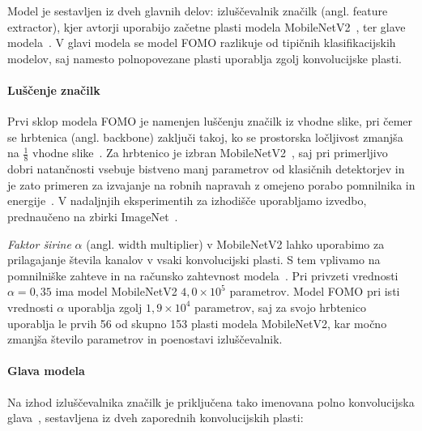 \documentclass[a4paper,twoside,openright,12pt,slovene]{book}
\begin{document}
            Model je sestavljen iz dveh glavnih delov: izluščevalnik značilk (angl. feature extractor), kjer avtorji uporabijo začetne plasti modela MobileNetV2~\cite{src:sandler2018mobilenetv2}, ter glave modela~\cite{src:fomodocs}.
            V glavi modela se model FOMO razlikuje od tipičnih klasifikacijskih modelov, saj namesto polnopovezane plasti uporablja zgolj konvolucijske plasti.
    
            \paragraph{Luščenje značilk} \label{sct:fomo-ekstraktor-znacilk}
            Prvi sklop modela FOMO je namenjen luščenju značilk iz vhodne slike, pri čemer se hrbtenica (angl. backbone) zaključi takoj, ko se prostorska ločljivost zmanjša na $\tfrac18$ vhodne slike~\cite{src:fomodocs}.  
            Za hrbtenico je izbran MobileNetV2~\cite{src:sandler2018mobilenetv2}, saj pri primerljivo dobri natančnosti vsebuje bistveno manj parametrov od klasičnih detektorjev in je zato primeren za izvajanje na robnih napravah z omejeno porabo pomnilnika in energije~\cite{src:sandler2018mobilenetv2}. V nadaljnjih eksperimentih za izhodišče uporabljamo izvedbo, prednaučeno na zbirki ImageNet~\cite{src:russakovsky2015imagenet}.

            \textit{Faktor širine} $\alpha$ (angl. width multiplier) v MobileNetV2 lahko uporabimo za prilagajanje števila kanalov v vsaki konvolucijski plasti. S tem vplivamo na pomnilniške zahteve in na računsko zahtevnost modela~\cite{src:sandler2018mobilenetv2}.
            Pri privzeti vrednosti $\alpha = 0{,}35$ ima model MobileNetV2 $4{,}0 \times 10^{5}$ parametrov.
            Model FOMO pri isti vrednosti $\alpha$ uporablja zgolj $1{,}9 \times 10^{4}$ parametrov, saj za svojo hrbtenico uporablja le prvih 56 od skupno 153 plasti modela MobileNetV2, kar močno zmanjša število parametrov in poenostavi izluščevalnik.

            \paragraph{Glava modela} \label{sct:glava_modela}
            Na izhod izluščevalnika značilk je priključena tako imenovana polno konvolucijska glava~\cite{src:long2015fully}, sestavljena iz dveh zaporednih konvolucijskih plasti:
            
\end{document}
